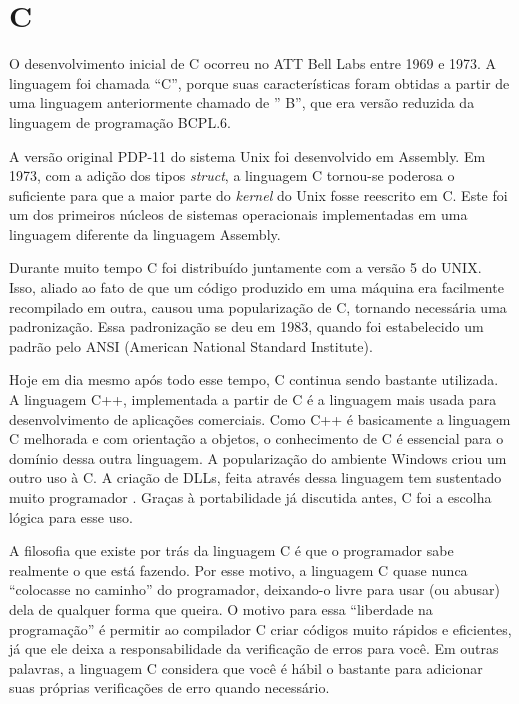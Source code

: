 \documentclass[
    12pt,               %
    openany,            %
    twoside,            %
    a4paper,            %
    brazil              %
    ]{abntex2}
\begin{document}
\section{C}

O desenvolvimento inicial de C ocorreu no ATT Bell Labs entre 1969 e 1973. A
linguagem foi chamada “C”, porque suas características foram obtidas a partir
de uma linguagem anteriormente chamado de ” B”, que era versão reduzida da
linguagem de programação BCPL.6.

A versão original PDP-11 do sistema Unix foi desenvolvido em Assembly. Em 1973,
com a adição dos tipos \textit{struct}, a linguagem C tornou-se poderosa o
suficiente para que a maior parte do \textit{kernel} do Unix fosse reescrito em
C. Este foi um dos primeiros núcleos de sistemas operacionais implementadas em
uma linguagem diferente da linguagem Assembly. 

Durante muito tempo C foi distribuído juntamente com a versão 5 do UNIX. Isso,
aliado ao fato de que um código produzido em uma máquina era facilmente
recompilado em outra, causou uma popularização de C, tornando necessária uma
padronização. Essa padronização se deu em 1983, quando foi estabelecido um
padrão pelo ANSI (American National Standard Institute).

Hoje em dia mesmo após todo esse tempo, C continua sendo bastante utilizada. A
linguagem C++, implementada a partir de C é a linguagem mais usada para
desenvolvimento de aplicações comerciais.  Como C++ é basicamente a linguagem C
melhorada e com orientação a objetos, o conhecimento de C é essencial para o
domínio dessa outra linguagem. A popularização do ambiente Windows criou um
outro uso à C. A criação de DLLs, feita através dessa linguagem tem sustentado
muito programador . Graças à portabilidade já discutida antes, C foi a escolha
lógica para esse uso.

A filosofia que existe por trás da linguagem C é que o programador sabe
realmente o que está fazendo.  Por esse motivo, a linguagem C quase nunca
“colocasse no caminho” do programador, deixando-o livre para usar (ou abusar)
dela de qualquer forma que queira. O motivo para essa “liberdade na
programação” é permitir ao compilador C criar códigos muito rápidos e
eficientes, já que ele deixa a responsabilidade da verificação de erros para
você. Em outras palavras, a linguagem C considera que você é hábil o bastante
para adicionar suas próprias verificações de erro quando necessário. 
\end{document}
